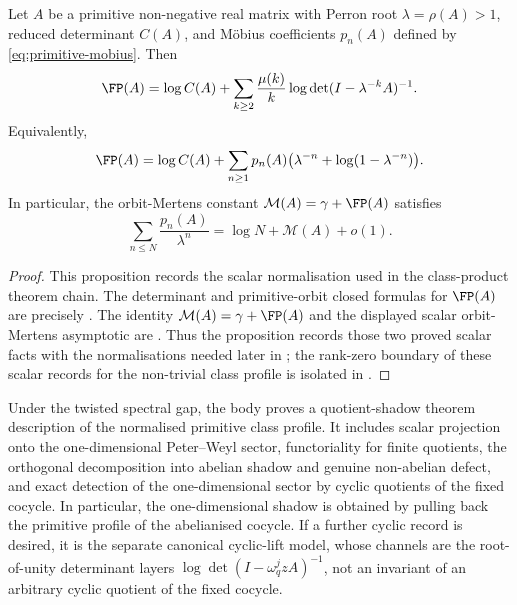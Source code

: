 \begin{proposition}
  \label{prop:intro-scalar-finite-part-computation}
  \label{thm:intro-finite-part}
  Let \(A\) be a primitive non-negative real matrix with Perron root
  \(\lambda=\rho(A)>1\), reduced determinant \(C(A)\), and M\"obius
  coefficients \(p_n(A)\) defined by \eqref{eq:primitive-mobius}. Then
  \[
    \FP(A)
    =\log C(A)
      +\sum_{k\ge 2}\frac{\mu(k)}{k}
        \log\det(I-\lambda^{-k}A)^{-1}.
  \]
  Equivalently,
  \[
    \FP(A)
    =\log C(A)
      +\sum_{n\ge 1}p_n(A)
        \bigl(\lambda^{-n}+\log(1-\lambda^{-n})\bigr).
  \]
  In particular, the orbit-Mertens constant
  \(\mathcal M(A)=\gamma+\FP(A)\) satisfies
  \[
    \sum_{n\le N}\frac{p_n(A)}{\lambda^n}
    =\log N+\mathcal M(A)+o(1).
  \]
\end{proposition}

\begin{proof}
  This proposition records the scalar normalisation used in the class-product
  theorem chain.
  The determinant and primitive-orbit closed formulas for \(\FP(A)\) are
  precisely . The identity
  \(\mathcal M(A)=\gamma+\FP(A)\) and the displayed scalar orbit-Mertens
  asymptotic are . Thus the
  proposition records those two proved scalar facts with the normalisations
  needed later in
; the rank-zero boundary of
  these scalar records for the non-trivial class profile is isolated in
  .
\end{proof}


\begin{corollary}
  \label{thm:intro-quotient-shadow}
  Under the twisted spectral gap, the body proves a quotient-shadow theorem
description of the normalised primitive class profile.  It includes scalar
  projection onto the one-dimensional Peter--Weyl sector, functoriality for
  finite quotients, the orthogonal decomposition into abelian shadow and
  genuine non-abelian defect, and exact detection of the one-dimensional
  sector by cyclic quotients of the fixed cocycle.  In particular, the
  one-dimensional shadow is obtained by pulling back the primitive profile
  of the abelianised cocycle.  If a further cyclic record is desired, it is
  the separate canonical cyclic-lift model, whose channels are the
  root-of-unity determinant layers
  \(\log\det(I-\omega_q^j zA)^{-1}\), not an invariant of an arbitrary
  cyclic quotient of the fixed cocycle.
\end{corollary}


